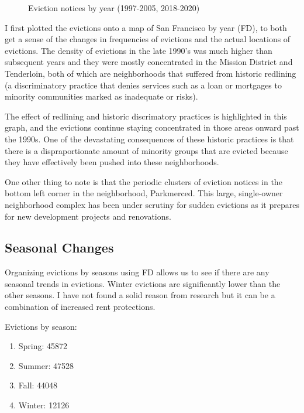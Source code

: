 \documentclass{article}\usepackage[]{graphicx}\usepackage[]{xcolor}
\begin{document}
\begin{figure}[htbp]
    \caption{Eviction notices by year (1997-2005, 2018-2020)}
    \label{fig:images}
\end{figure}

I first plotted the evictions onto a map of San Francisco by year (FD), to both get a sense of the changes in frequencies of evictions and the actual locations of evictions. The density of evictions in the late 1990's was much higher than subsequent years and they were mostly concentrated in the Mission District and Tenderloin, both of which are neighborhoods that suffered from historic redlining (a discriminatory practice that denies services such as a loan or mortgages to minority communities marked as inadequate or risks).

The effect of redlining and historic discrimatory practices is highlighted in this graph, and the evictions continue staying concentrated in those areas onward past the 1990s. One of the devastating consequences of these historic practices is that there is a dispraportionate amount of minority groups that are evicted because they have effectively been pushed into these neighborhoods.

One other thing to note is that the periodic clusters of eviction notices in the bottom left corner in the neighborhood, Parkmerced. This large, single-owner neighborhood complex has been under scrutiny for sudden evictions as it prepares for new development projects and renovations.

\pagebreak

\subsection{Seasonal Changes}
Organizing evictions by seasons using FD allows us to see if there are any seasonal trends in evictions. Winter evictions are significantly lower than the other seasons. I have not found a solid reason from research but it can be a combination of increased rent protections.

Evictions by season:
\begin{enumerate}
    \item Spring: 45872
    \item Summer: 47528
    \item Fall: 44048
    \item Winter: 12126
\end{enumerate}
\end{document}
